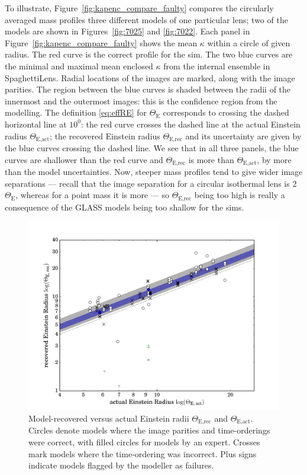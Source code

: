 \documentclass[usenatbib]{mn2e}
\newcommand{\spl}{SpaghettiLens\xspace}
\newcommand{\ERf}[1][]{$\Theta_\text{E#1}$\xspace} %
\newcommand{\figref}[1]{Figure~\ref{fig:#1}}
\begin{document}
To illustrate, \figref{kapenc_compare_faulty} compares the circularly
averaged mass profiles three different models of one particular lens;
two of the models are shown in Figures~\ref{fig:7025} and
\ref{fig:7022}. Each panel in \figref{kapenc_compare_faulty} shows the
mean $\kappa$ within a circle of given radius.  The red curve is the
correct profile for the sim.  The two blue curves are the minimal and
maximal mean enclosed $\kappa$ from the internal ensemble in \spl.
Radial locations of the images are marked, along with the image
parities.  The region between the blue curves is shaded between the
radii of the innermost and the outermost images: this is the
confidence region from the modelling.  The definition \eqref{eq:effRE}
for \ERf corresponds to crossing the dashed horizontal line at $10^0$:
the red curve crosses the dashed line at the actual Einstein radius
\ERf[,act]; the recovered Einstein radius \ERf[,rec] and its
uncertainty are given by the blue curves crossing the dashed line.  We
see that in all three panels, the blue curves are shallower than the
red curve and \ERf[,rec] is more than \ERf[,act], by more than the
model uncertainties.  Now, steeper mass profiles tend to give wider
image separations --- recall that the image separation for a circular
isothermal lens is 2\ERf, whereas for a point mass it is more
\citep[see, e.g.,][]{2002LNP...608....1C} --- so \ERf[,rec] being too
high is really a consequence of the GLASS models being too shallow for
the sims.

\begin{figure}
  \centering
    \includegraphics[width=0.90\linewidth]{fig/eR_5}
  \caption{Model-recovered versus actual Einstein radii \ERf[,rec] and
    \ERf[,act].  Circles denote models where the image parities and
    time-orderings were correct, with filled circles for models by an
    expert.  Crosses mark models where the time-ordering was
    incorrect.  Plus signs indicate models flagged by the modeller as
    failures.}
  \label{fig:ER_per_sim}
\end{figure}
\end{document}
